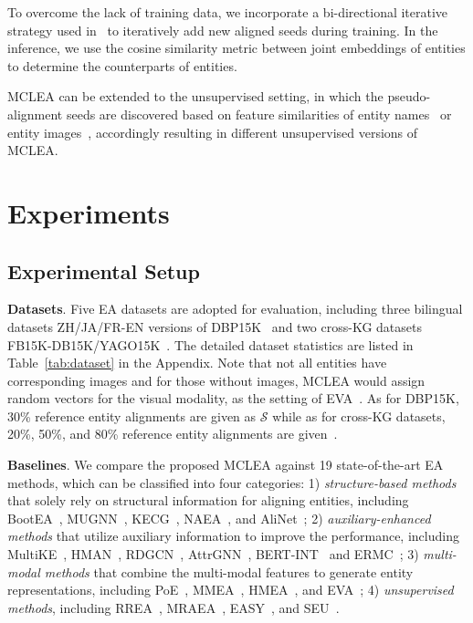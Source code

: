 \documentclass[11pt]{article}
\begin{document}
To overcome the lack of training data, we incorporate a bi-directional iterative strategy used in~\cite{liu2021visual} to iteratively add new aligned seeds during training.
In the inference, we use the cosine similarity metric between joint embeddings of entities to determine the counterparts of entities.



MCLEA can be extended to the unsupervised setting, in which the pseudo-alignment seeds are discovered based on feature similarities of entity names~\cite{mao2020mraea,ge2021make} or entity images~\cite{liu2021visual}, accordingly resulting in different unsupervised versions of MCLEA.
 
\section{Experiments}



\subsection{Experimental Setup}
\noindent\textbf{Datasets}.
Five EA datasets are adopted for evaluation, including three bilingual datasets ZH/JA/FR-EN versions of DBP15K~\cite{liu2021visual} and two cross-KG datasets FB15K-DB15K/YAGO15K~\cite{liu2019mmkg}.
The detailed dataset statistics are listed in Table~\ref{tab:dataset} in the Appendix.
Note that not all entities have corresponding images and for those without images, MCLEA would assign random vectors for the visual modality, as the setting of EVA~\cite{liu2021visual}.
As for DBP15K, 30\% reference entity alignments are given as $\mathcal{S}$ while as for cross-KG datasets, 20\%, 50\%, and 80\% reference entity alignments are given~\cite{liu2019mmkg}.

\noindent\textbf{Baselines}.
We compare the proposed MCLEA against 19 state-of-the-art EA methods, which can be classified into four categories:
1) \textit{structure-based methods} that solely rely on structural information for aligning entities, including BootEA~\cite{sun2018bootstrapping}, MUGNN~\cite{cao2019multi}, KECG~\cite{li2019semi}, NAEA~\cite{zhu2019neighborhood}, and AliNet~\cite{sun2020knowledge};
2) \textit{auxiliary-enhanced methods} that utilize auxiliary information to improve the performance, including MultiKE~\cite{zhang2019multi}, HMAN~\cite{yang2019aligning},
RDGCN~\cite{wu2019relation}, AttrGNN~\cite{liu2020exploring}, BERT-INT~\cite{tang2021bert} and ERMC~\cite{yang2021entity};
3) \textit{multi-modal methods} that combine the multi-modal features to generate entity representations, including PoE~\cite{liu2019mmkg}, MMEA~\cite{chen2020mmea}, HMEA~\cite{guo2021multi}, and EVA~\cite{liu2021visual};
4) \textit{unsupervised methods}, including RREA~\cite{mao2020relational}, MRAEA~\cite{mao2020mraea}, EASY~\cite{ge2021make}, and SEU~\cite{mao2021alignment}.
\end{document}

